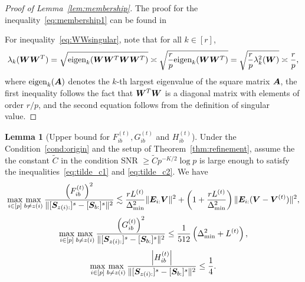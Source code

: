 \documentclass[lettersize,onecolumn,journal]{IEEEtran}
\theoremstyle{definition}
\newtheorem{lem}{Lemma}
\theoremstyle{definition}
\newcommand{\of}[1]{\left(#1\right)}
\newcommand{\aabs}[1]{\left|#1\right|}
\begin{document}
\begin{proof}[Proof of Lemma~\ref{lem:membership}] The proof for the inequality~\eqref{eq:membership1} can be found in \citet[Proof of Lemma 4]{han2020exact}

For inequality~\eqref{eq:WWsingular}, note that for all $k \in [r]$,
\begin{align}
    \lambda_k(\bm{W}\bm{W}^T) = \sqrt{\text{eigen}_k (\bm{W} \bm{W}^T\bm{W}\bm{W}^T)} \asymp \sqrt{\frac{r}{p} \text{eigen}_k (\bm{W} \bm{W}^T)} = \sqrt{\frac{r}{p} \lambda^2_k(\bm{W})} \asymp \frac{r}{p},
\end{align}
where $\text{eigen}_k(\bm A)$ denotes the $k$-th largest eigenvalue of the square matrix $\bm A$, the first inequality follows the fact that $\bm{W}^T\bm{W}$ is a diagonal matrix with elements of order $r/p$, and the second equation follows from the definition of singular value.
\end{proof}

\begin{lem}[Upper bound for $F_{ib}^{(t)}, G_{ib}^{(t)}$ and $H_{ib}^{(t)}$]\label{lem:upper_fgh} Under the Condition~\ref{cond:origin} and the setup of Theorem~\ref{thm:refinement},  assume the the constant $\tilde C$ in the condition SNR $\geq \tilde C p^{-K/2} \log p$ is large enough to satisfy the inequalities~\eqref{eq:tilde_c1} and \eqref{eq:tilde_c2}. We have 
    \begin{equation}\label{eq:fib}
        \max_{i \in [p]} \max_{b \neq z(i)} \frac{\of{F_{ib}^{(t)}}^2}{ \onormSize{}{ [  \mS_{z(i):} ]^s  -  [ \mS_{b:} ]^s }^2 } \lesssim  \frac{r L^{(t)}}{ \Delta_{\min}^2} \onormSize{}{\mE_{i:} \mV}^2 + \of{1 +  \frac{ r L^{(t)}}{ \Delta_{\min}^2}} \onormSize{}{\mE_{i:} (\mV - \mV^{(t)})}^2 ,
    \end{equation}
    \begin{equation}\label{eq:gib}
        \max_{i \in [p]} \max_{b \neq z(i)} \frac{ \of{  G_{ib}^{(t)} }^2  }{ \onormSize{}{ [\mS_{z(i):} ]^s - [\mS_{b:}]^s }^2}  \leq  \frac{1}{512} \of{ \Delta_{\min}^2 +L^{(t)}},
    \end{equation}
    \begin{equation}\label{eq:hib}
        \max_{i \in [p]} \max_{b \neq z(i)}  \frac{ \aabs{  H_{ib}^{(t)} }  }{ \onormSize{}{ [\mS_{z(i):} ]^s - [\mS_{b:}]^s }^2} \leq \frac{1}{4}.
    \end{equation}
    \end{lem}
    
\end{document}
